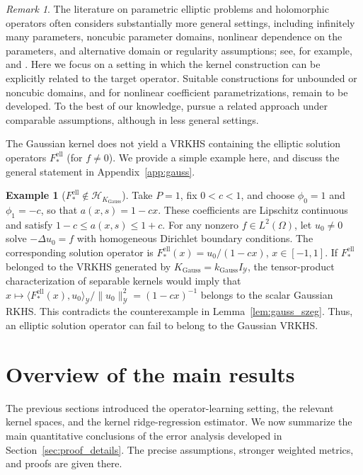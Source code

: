 \documentclass[11pt]{article}
\numberwithin{equation}{section}
\theoremstyle{plain}
\theoremstyle{definition}
\newtheorem{example}[theorem]{Example}
\theoremstyle{remark}
\newtheorem{remark}[theorem]{Remark}
\newcommand{\Hs}{\mathcal{H}}
\begin{document}
\begin{remark}\label{rem:assumptions}
The literature on parametric elliptic problems and holomorphic operators
often considers substantially more general settings, including infinitely
many parameters, noncubic parameter domains, nonlinear dependence on the
parameters, and alternative domain or regularity assumptions; see, for
example, \cite{adcock2024learning} and \cite{kuo2017multilevel}. Here we
focus on a setting in which the kernel construction can be explicitly related
to the target operator. Suitable constructions for unbounded or noncubic
domains, and for nonlinear coefficient parametrizations, remain to be
developed. To the best of our knowledge,
\cite{griebel2017reproducing,kempf2019kernel} pursue a related approach under
comparable assumptions, although in less general settings.
\end{remark}

The Gaussian kernel does not yield a VRKHS containing the elliptic solution operators $F_*^{\mathrm{ell}}$ (for $f\neq0$). We provide a simple example here, and discuss the general statement in Appendix~\ref{app:gauss}.
\begin{example}[$F_*^{\mathrm{ell}}\notin \Hs_{K_{\text{Gauss}}}$]\label{ex:gauss}
Take \(P=1\), fix \(0<c<1\), and choose \(\phi_0=1\) and \(\phi_1=-c\), so that \(a(x,s)=1-cx\). These coefficients are Lipschitz continuous and satisfy \(1-c\leq a(x,s)\leq1+c\). For any nonzero \(f\in L^2(\Omega)\), let \(u_0\neq0\) solve \(-\Delta u_0=f\) with homogeneous Dirichlet boundary conditions. The corresponding solution operator is
\(F_*^{\mathrm{ell}}(x)=u_0/(1-cx)\), \(x\in[-1,1]\).
If \(F_*^{\mathrm{ell}}\) belonged to the VRKHS generated by \(K_{\mathrm{Gauss}}=k_{\mathrm{Gauss}}I_{\mathcal Y}\), the tensor-product characterization of separable kernels would imply that
\(x\mapsto\langle F_*^{\mathrm{ell}}(x),u_0\rangle_{\mathcal Y}/\|u_0\|_{\mathcal Y}^2=(1-cx)^{-1}\)
belongs to the scalar Gaussian RKHS. This contradicts the counterexample in Lemma~\ref{lem:gauss_szeg}. Thus, an elliptic solution operator can fail to belong to the Gaussian VRKHS.
\end{example}

\section{Overview of the main results}
\label{sec:overview}

The previous sections introduced the operator-learning setting, the relevant
kernel spaces, and the kernel ridge-regression estimator. We now summarize the
main quantitative conclusions of the error analysis developed in
Section~\ref{sec:proof_details}. The precise assumptions, stronger weighted
metrics, and proofs are given there.
\end{document}
